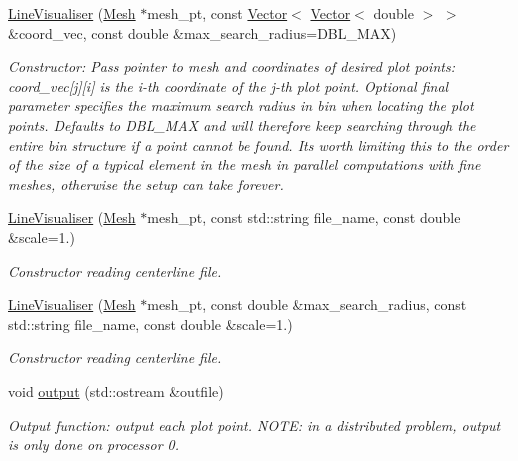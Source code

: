 \begin{DoxyCompactItemize}
\item 
\hyperlink{classoomph_1_1LineVisualiser_a4b309f24ea1bd65b6d4324ca564f3b0d}{Line\+Visualiser} (\hyperlink{classoomph_1_1Mesh}{Mesh} $\ast$mesh\+\_\+pt, const \hyperlink{classoomph_1_1Vector}{Vector}$<$ \hyperlink{classoomph_1_1Vector}{Vector}$<$ double $>$ $>$ \&coord\+\_\+vec, const double \&max\+\_\+search\+\_\+radius=D\+B\+L\+\_\+\+M\+AX)
\begin{DoxyCompactList}\small\item\em Constructor\+: Pass pointer to mesh and coordinates of desired plot points\+: coord\+\_\+vec\mbox{[}j\mbox{]}\mbox{[}i\mbox{]} is the i-\/th coordinate of the j-\/th plot point. Optional final parameter specifies the maximum search radius in bin when locating the plot points. Defaults to D\+B\+L\+\_\+\+M\+AX and will therefore keep searching through the entire bin structure if a point cannot be found. It\textquotesingle{}s worth limiting this to the order of the size of a typical element in the mesh in parallel computations with fine meshes, otherwise the setup can take forever. \end{DoxyCompactList}\item 
\hyperlink{classoomph_1_1LineVisualiser_a3eb2567997926ed29a6c8731d1e677c0}{Line\+Visualiser} (\hyperlink{classoomph_1_1Mesh}{Mesh} $\ast$mesh\+\_\+pt, const std\+::string file\+\_\+name, const double \&scale=1.)
\begin{DoxyCompactList}\small\item\em Constructor reading centerline file. \end{DoxyCompactList}\item 
\hyperlink{classoomph_1_1LineVisualiser_ab299c77effef14974955204e43457812}{Line\+Visualiser} (\hyperlink{classoomph_1_1Mesh}{Mesh} $\ast$mesh\+\_\+pt, const double \&max\+\_\+search\+\_\+radius, const std\+::string file\+\_\+name, const double \&scale=1.)
\begin{DoxyCompactList}\small\item\em Constructor reading centerline file. \end{DoxyCompactList}\item 
void \hyperlink{classoomph_1_1LineVisualiser_adafda17eaa1c034ff7236e1f7dcbc771}{output} (std\+::ostream \&outfile)
\begin{DoxyCompactList}\small\item\em Output function\+: output each plot point. N\+O\+TE\+: in a distributed problem, output is only done on processor 0. \end{DoxyCompactList}\item 

\end{DoxyCompactItemize}
